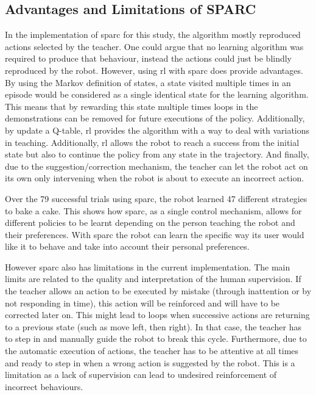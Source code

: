 \subsection{Advantages and Limitations of SPARC}

In the implementation of \gls{sparc} for this study, the algorithm mostly reproduced actions selected by the teacher. One could argue that no learning algorithm was required to produce that behaviour, instead the actions could just be blindly reproduced by the robot. However, using \gls{rl} with \gls{sparc} does provide advantages. By using the Markov definition of states, a state visited multiple times in an episode would be considered as a single identical state for the learning algorithm. This means that by rewarding this state multiple times loops in the demonstrations can be removed for future executions of the policy. Additionally, by update a Q-table, \gls{rl} provides the algorithm with a way to deal with variations in teaching. Additionally, \gls{rl} allows the robot to reach a success from the initial state but also to continue the policy from any state in the trajectory. And finally, due to the suggestion/correction mechanism, the teacher can let the robot act on its own only intervening when the robot is about to execute an incorrect action. 

Over the 79 successful trials using \gls{sparc}, the robot learned 47 different strategies to bake a cake. This shows how \gls{sparc}, as a single control mechanism, allows for different policies to be learnt depending on the person teaching the robot and their preferences. With \gls{sparc} the robot can learn the specific way its user would like it to behave and take into account their personal preferences.

However \gls{sparc} also has limitations in the current implementation. The main limits are related to the quality and interpretation of the human supervision. If the teacher allows an action to be executed by mistake (through inattention or by not responding in time), this action will be reinforced and will have to be corrected later on. This might lead to loops when successive actions are returning to a previous state (such as move left, then right). In that case, the teacher has to step in and manually guide the robot to break this cycle. Furthermore, due to the automatic execution of actions, the teacher has to be attentive at all times and ready to step in when a wrong action is suggested by the robot. This is a limitation as a lack of supervision can lead to undesired reinforcement of incorrect behaviours.

